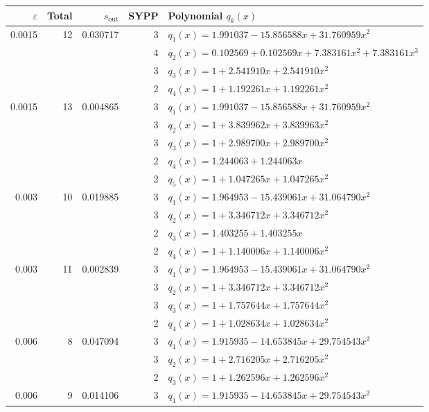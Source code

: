 \documentclass[11pt]{article}
\begin{document}
\begin{table}[htbp]
  \centering
  \small
  \begin{tabular}{r r r r l}
    \hline
    $\varepsilon$ & Total & $s_{\mathrm{out}}$ & SYPP & Polynomial $q_k(x)$ \\
    \hline
    0.0015 & 12 & 0.030717 & 3 & $q_1(x)=1.991037-15.856588x+31.760959x^2$ \\
           &    &          & 4 & $q_2(x)=0.102569+0.102569x+7.383161x^2+7.383161x^3$ \\
           &    &          & 3 & $q_3(x)=1+2.541910x+2.541910x^2$ \\
           &    &          & 2 & $q_4(x)=1+1.192261x+1.192261x^2$ \\
    \hline
    0.0015 & 13 & 0.004865 & 3 & $q_1(x)=1.991037-15.856588x+31.760959x^2$ \\
           &    &          & 3 & $q_2(x)=1+3.839962x+3.839963x^2$ \\
           &    &          & 3 & $q_3(x)=1+2.989700x+2.989700x^2$ \\
           &    &          & 2 & $q_4(x)=1.244063+1.244063x$ \\
           &    &          & 2 & $q_5(x)=1+1.047265x+1.047265x^2$ \\
    \hline
    0.003 & 10 & 0.019885 & 3 & $q_1(x)=1.964953-15.439061x+31.064790x^2$ \\
          &    &          & 3 & $q_2(x)=1+3.346712x+3.346712x^2$ \\
          &    &          & 2 & $q_3(x)=1.403255+1.403255x$ \\
          &    &          & 2 & $q_4(x)=1+1.140006x+1.140006x^2$ \\
    \hline
    0.003 & 11 & 0.002839 & 3 & $q_1(x)=1.964953-15.439061x+31.064790x^2$ \\
          &    &          & 3 & $q_2(x)=1+3.346712x+3.346712x^2$ \\
          &    &          & 3 & $q_3(x)=1+1.757644x+1.757644x^2$ \\
          &    &          & 2 & $q_4(x)=1+1.028634x+1.028634x^2$ \\
    \hline
    0.006 &  8 & 0.047094 & 3 & $q_1(x)=1.915935-14.653845x+29.754543x^2$ \\
          &    &          & 3 & $q_2(x)=1+2.716205x+2.716205x^2$ \\
          &    &          & 2 & $q_3(x)=1+1.262596x+1.262596x^2$ \\
    \hline
    0.006 &  9 & 0.014106 & 3 & $q_1(x)=1.915935-14.653845x+29.754543x^2$ \\

\end{tabular}
\end{table}
\end{document}
